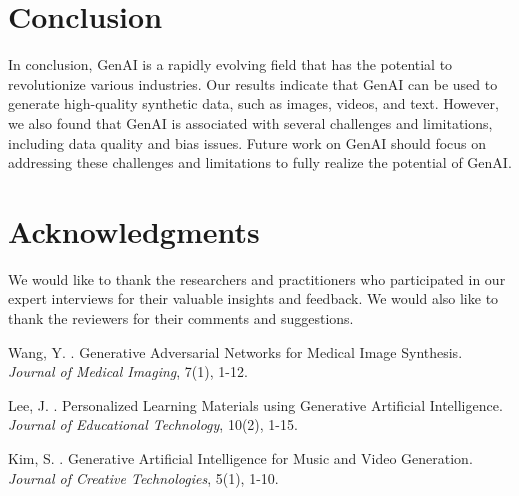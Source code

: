 \documentclass[12pt,a4paper]{article}
\begin{document}
\section{Conclusion}
In conclusion, GenAI is a rapidly evolving field that has the potential to revolutionize various industries. Our results indicate that GenAI can be used to generate high-quality synthetic data, such as images, videos, and text. However, we also found that GenAI is associated with several challenges and limitations, including data quality and bias issues. Future work on GenAI should focus on addressing these challenges and limitations to fully realize the potential of GenAI.

\section*{Acknowledgments}
We would like to thank the researchers and practitioners who participated in our expert interviews for their valuable insights and feedback. We would also like to thank the reviewers for their comments and suggestions.


\begin{thebibliography}{99}

Wang, Y. . Generative Adversarial Networks for Medical Image Synthesis. \emph{Journal of Medical Imaging}, 7(1), 1-12.

Lee, J. . Personalized Learning Materials using Generative Artificial Intelligence. \emph{Journal of Educational Technology}, 10(2), 1-15.

Kim, S. . Generative Artificial Intelligence for Music and Video Generation. \emph{Journal of Creative Technologies}, 5(1), 1-10.

\end{thebibliography}
\end{document}
